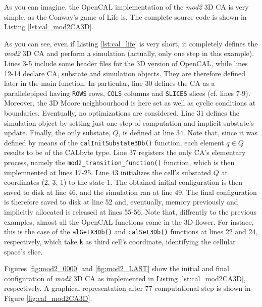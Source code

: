 As you can imagine, the OpenCAL implementation of the \emph{mod2} 3D
CA is very simple, as the Conway's game of Life is. The complete
source code is shown in Listing \ref{lst:cal_mod2CA3D}.



As you can see, even if Listing \ref{lst:cal_life} is very short, it
completely defines the \emph{mod2} 3D CA and perform a simulation
(actually, only one step in this example). Lines 3-5 include some
header files for the 3D version of OpenCAL, while lines 12-14 declare
CA, substate and simulation objects. They are therefore defined later
in the main function. In particular, line 30 defines the CA as a
parallelepiped having \verb'ROWS' rows, \verb'COLS' columns and
\verb'SLICES' slices (cf. lines 7-9). Moreover, the 3D Moore
neighbourhood is here set as well as cyclic conditions at
boundaries. Eventually, no optimizations are considered. Line 31
defines the simulation object by setting just one step of computation
and implicit substate's update. Finally, the only substate, $Q$, is
defined at line 34. Note that, since it was defined by means of the
\verb'calInitSubstate3Db()' function, each element $q \in Q$ results
to be of the CALbyte type. Line 37 registers the only CA's elementary
process, namely the \verb'mod2_transition_function()' function, which
is then implemnented at lines 17-25. Line 43 initializes the cell's
substated $Q$ at coordinates (2, 3, 1) to the state 1. The obtained
initial configuration is then saved to disk at line 46, and the
simulation ran at line 49. The final configuration is therefore saved
to disk at line 52 and, eventually, memory previously and implicitly
allocated is released at lines 55-56. Note that, diffrently to the
previous examples, almost all the OpenCAL functions come in the 3D
flower. For instace, this is the case of the \verb'alGetX3Db()' and
\verb'calSet3Db()' functions at lines 22 and 24, respectively, which
take \verb'k' as third cell's coordinate, identifying the cellular
space's slice.

Figures \ref{fig:mod2_0000} and \ref{fig:mod2_LAST} show the initial
and final configuration of \emph{mod2} 3D CA as implemented in Listing
\ref{lst:cal_mod2CA3D}, respectively. A graphical representation after
77 computational step is shown in Figure \ref{fig:cal_mod2CA3D}.

